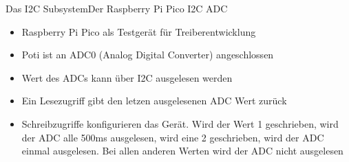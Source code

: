 \documentclass[aspectratio=169]{beamer}
\begin{document}
\begin{frame}[fragile]{Das I2C Subsystem}{Der Raspberry Pi Pico I2C ADC}
	\begin{itemize}
		\item Raspberry Pi Pico als Testgerät für Treiberentwicklung
		\item Poti ist an ADC0 (Analog Digital Converter) angeschlossen
		\item Wert des ADCs kann über I2C ausgelesen werden
		\item Ein Lesezugriff gibt den letzen ausgelesenen ADC Wert zurück
		\item Schreibzugriffe konfigurieren das Gerät. Wird der Wert 1 geschrieben, wird der ADC alle 500ms ausgelesen, wird eine 2 geschrieben, wird der ADC einmal ausgelesen. Bei allen anderen Werten wird der ADC nicht ausgelesen
	\end{itemize}
\end{frame}
\end{document}
